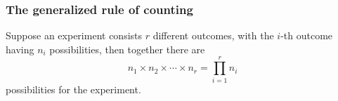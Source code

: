 \documentclass[slidestop,compress,mathserif]{beamer}
\begin{document}
\begin{frame}\frametitle{The generalized rule of counting}

\begin{dinglist}{\DingListSymbolA}
\item Suppose an experiment  consists $r$ different outcomes, with the $i$-th outcome having $n_i$ possibilities,
then together there are
\[
n_1 \times n_2 \times \cdots \times n_r = \prod_{i=1}^r n_i
\]
possibilities for the experiment.
\end{dinglist}



\end{frame}
\end{document}

